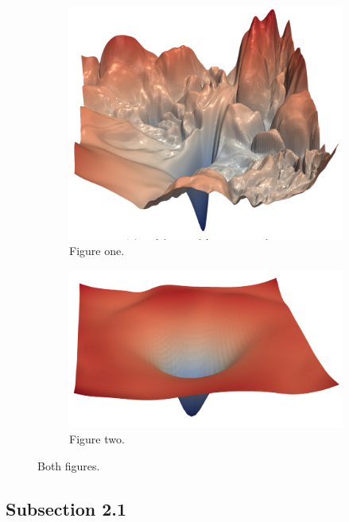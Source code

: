 \documentclass{article} %
\begin{document}
\begin{figure}[H]
	\centering
	\begin{subfigure}{2in}
		\includegraphics[width=1\textwidth]{images/mse-visu-1}
		\caption{Figure one.}
		\label{fig:mse-visu-1}
	\end{subfigure}	
	\begin{subfigure}{2in}
		\includegraphics[width=1\textwidth]{images/mse-visu-2}
		\caption{Figure two.}
		\label{fig:mse-visu-2}
	\end{subfigure}
	\caption{Both figures.}
\label{fig:mse-visu-12}
\end{figure}

\subsection{Subsection 2.1}
\end{document}
